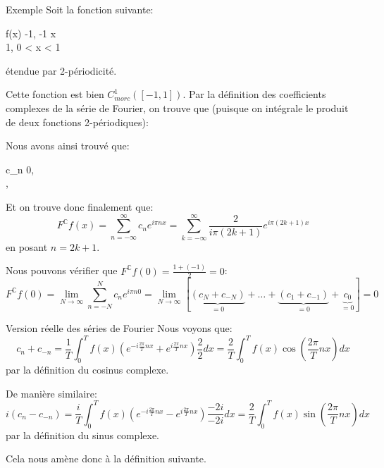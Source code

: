\documentclass[a4paper]{article}
\begin{document}
\begin{parag}{Exemple}
    Soit la fonction suivante:
    \begin{functionbypart}{f\left(x\right)}
    -1, \mathspace {} -1 \leq x  \\
    1, \mathspace {} 0 < x < 1
    \end{functionbypart}
    étendue par 2-périodicité.


    Cette fonction est bien $C^1_{morc}\left(\left[-1, 1\right]\right)$. Par la définition des coefficients complexes de la série de Fourier, on trouve que (puisque on intégrale le produit de deux fonctions 2-périodiques): 

    Nous avons ainsi trouvé que:
    \begin{functionbypart}{c_n}
    0, \mathspace {}  \\
    , \mathspace {} 
    \end{functionbypart}

    Et on trouve donc finalement que: 
    \[F^{\mathbb{C}} f\left(x\right) = \sum_{n=-\infty}^{\infty} c_n e^{i \pi n x} = \sum_{k=-\infty}^{\infty} \frac{2}{i\pi\left(2k +1\right)} e^{i \pi \left(2k + 1\right)x}\]
    en posant $n = 2k + 1$.
    
    Nous pouvons vérifier que $F^{\mathbb{C}} f\left(0\right) = \frac{1 + \left(-1\right)}{2} = 0$: 
    \[F^{\mathbb{C}} f\left(0\right) = \lim_{N \to \infty} \sum_{n=-N}^{N} c_n e^{i \pi n 0} = \lim_{N \to \infty} \left[\underbrace{\left(c_N + c_{-N}\right)}_{= 0} + \ldots + \underbrace{\left(c_1 + c_{-1}\right)}_{= 0} + \underbrace{c_0}_{= 0}\right] = 0\]
\end{parag}

\begin{parag}{Version réelle des séries de Fourier}
    Nous voyons que: 
    \[c_n + c_{-n} = \frac{1}{T} \int_{0}^{T} f\left(x\right) \left(e^{-i \frac{2\pi}{T} nx} + e^{i \frac{2\pi}{T} nx}\right) \frac{2}{2}dx = \frac{2}{T}\int_{0}^{T} f\left(x\right) \cos\left(\frac{2\pi}{T} nx\right) dx\]
    par la définition du cosinus complexe.

    De manière similaire: 
    \[i\left(c_n - c_{-n}\right) = \frac{i}{T} \int_{0}^{T} f\left(x\right) \left(e^{-i \frac{2\pi}{T}nx} - e^{i \frac{2\pi}{T} nx}\right) \frac{-2i}{-2i} dx = \frac{2}{T} \int_{0}^{T} f\left(x\right) \sin\left(\frac{2\pi}{T} nx\right)dx \]
    par la définition du sinus complexe.
    
    Cela nous amène donc à la définition suivante.
\end{parag}
\end{document}
